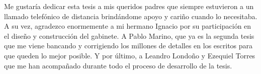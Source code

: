 
\begin{acknowledgements}      


Me gustaría dedicar esta tesis a mis queridos padres que siempre estuvieron a un llamado telefónico de distancia brindándome apoyo y cariño cuando lo necesitaba. A su vez, agradezco enormemente a mi hermano Ignacio por su participación en el diseño y construcción del gabinete. A Pablo Marino, que ya es la segunda tesis que me viene bancando y corrigiendo los millones de detalles en los escritos para que queden lo mejor posible. Y por último, a Leandro Londoño y Ezequiel Torres que me han acompañado durante todo el proceso de desarrollo de la tesis.


\end{acknowledgements}
